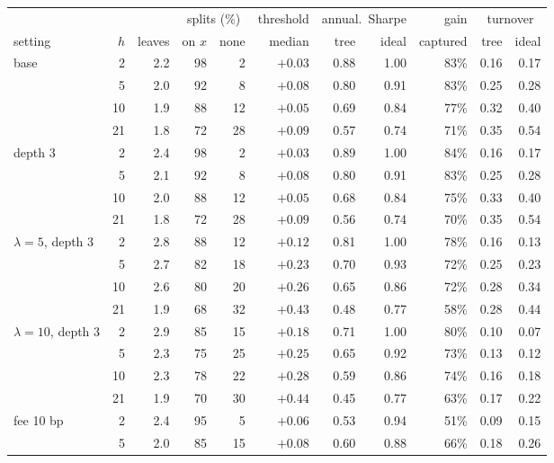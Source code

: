 \documentclass[11pt,a4paper]{article}
\newcommand{\1}{\mathbf{1}}
\begin{document}
\begin{table}[H]
\centering\small
\setlength{\tabcolsep}{4pt}
\begin{tabular}{@{}l r r rr r rr r rr@{}}
\toprule
& & & \multicolumn{2}{c}{splits (\%)} & threshold & \multicolumn{2}{c}{annual.\ Sharpe} & gain & \multicolumn{2}{c}{turnover}\\
\cmidrule(lr){4-5}\cmidrule(lr){7-8}\cmidrule(lr){10-11}
setting & $h$ & leaves & on $x$ & none & median & tree & ideal & captured & tree & ideal\\
\midrule
base & 2 & 2.2 & 98 & 2 & $+0.03$ & 0.88 & 1.00 & 83\% & 0.16 & 0.17\\
 & 5 & 2.0 & 92 & 8 & $+0.08$ & 0.80 & 0.91 & 83\% & 0.25 & 0.28\\
 & 10 & 1.9 & 88 & 12 & $+0.05$ & 0.69 & 0.84 & 77\% & 0.32 & 0.40\\
 & 21 & 1.8 & 72 & 28 & $+0.09$ & 0.57 & 0.74 & 71\% & 0.35 & 0.54\\
\midrule
depth 3 & 2 & 2.4 & 98 & 2 & $+0.03$ & 0.89 & 1.00 & 84\% & 0.16 & 0.17\\
 & 5 & 2.1 & 92 & 8 & $+0.08$ & 0.80 & 0.91 & 83\% & 0.25 & 0.28\\
 & 10 & 2.0 & 88 & 12 & $+0.05$ & 0.68 & 0.84 & 75\% & 0.33 & 0.40\\
 & 21 & 1.8 & 72 & 28 & $+0.09$ & 0.56 & 0.74 & 70\% & 0.35 & 0.54\\
\midrule
$\lambda=5$, depth 3 & 2 & 2.8 & 88 & 12 & $+0.12$ & 0.81 & 1.00 & 78\% & 0.16 & 0.13\\
 & 5 & 2.7 & 82 & 18 & $+0.23$ & 0.70 & 0.93 & 72\% & 0.25 & 0.23\\
 & 10 & 2.6 & 80 & 20 & $+0.26$ & 0.65 & 0.86 & 72\% & 0.28 & 0.34\\
 & 21 & 1.9 & 68 & 32 & $+0.43$ & 0.48 & 0.77 & 58\% & 0.28 & 0.44\\
\midrule
$\lambda=10$, depth 3 & 2 & 2.9 & 85 & 15 & $+0.18$ & 0.71 & 1.00 & 80\% & 0.10 & 0.07\\
 & 5 & 2.3 & 75 & 25 & $+0.25$ & 0.65 & 0.92 & 73\% & 0.13 & 0.12\\
 & 10 & 2.3 & 78 & 22 & $+0.28$ & 0.59 & 0.86 & 74\% & 0.16 & 0.18\\
 & 21 & 1.9 & 70 & 30 & $+0.44$ & 0.45 & 0.77 & 63\% & 0.17 & 0.22\\
\midrule
fee 10 bp & 2 & 2.4 & 95 & 5 & $+0.06$ & 0.53 & 0.94 & 51\% & 0.09 & 0.15\\
 & 5 & 2.0 & 85 & 15 & $+0.08$ & 0.60 & 0.88 & 66\% & 0.18 & 0.26\\

\end{tabular}
\end{table}
\end{document}
